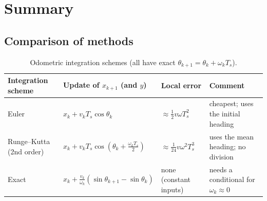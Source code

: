 \documentclass[11pt,a4paper]{article}
\newcommand{\Ts}{T_s}
\theoremstyle{definition}
\theoremstyle{plain}
\theoremstyle{remark}
\begin{document}
\section{Summary}

\subsection{Comparison of methods}

\begin{table}[htbp]
\centering
\small
\renewcommand{\arraystretch}{1.25}
\begin{tabularx}{\textwidth}{@{}l>{\raggedright\arraybackslash}X>{\raggedright\arraybackslash}X>{\raggedright\arraybackslash}X@{}}
\toprule
\textbf{Integration scheme} & \textbf{Update of $x_{k+1}$ (and $y$)} & \textbf{Local error} & \textbf{Comment}\\
\midrule
Euler & $x_k+v_k\Ts\cos\theta_k$ & $\approx\tfrac12v\omega\Ts^2$ & cheapest; uses the initial heading\\
Runge--Kutta (2nd order) & $x_k+v_k\Ts\cos(\theta_k+\tfrac{\omega_k\Ts}2)$ & $\approx\tfrac1{24}v\omega^2\Ts^3$ & uses the mean heading; no division\\
Exact & $x_k+\tfrac{v_k}{\omega_k}(\sin\theta_{k+1}-\sin\theta_k)$ & none (constant inputs) & needs a conditional for $\omega_k\approx0$\\
\bottomrule
\end{tabularx}
\caption{Odometric integration schemes (all have exact $\theta_{k+1}=\theta_k+\omega_k\Ts$).}
\end{table}
\end{document}
